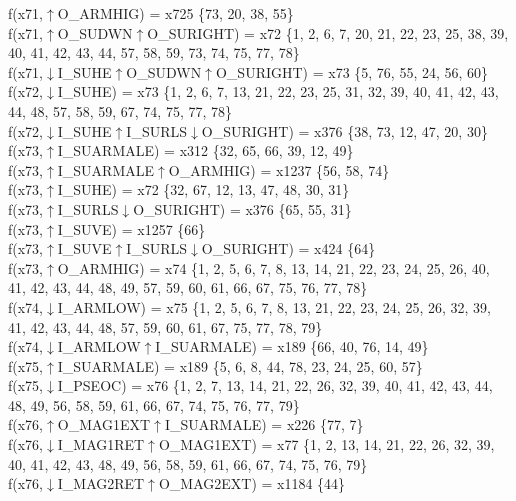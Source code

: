 f(x71,$\uparrow$O\_ARMHIG) = x725 \{73, 20, 38, 55\} \\  
f(x71,$\uparrow$O\_SUDWN$\uparrow$O\_SURIGHT) = x72 \{1, 2, 6, 7, 20, 21, 22, 23, 25, 38, 39, 40, 41, 42, 43, 44, 57, 58, 59, 73, 74, 75, 77, 78\} \\  
f(x71,$\downarrow$I\_SUHE$\uparrow$O\_SUDWN$\uparrow$O\_SURIGHT) = x73 \{5, 76, 55, 24, 56, 60\} \\  
f(x72,$\downarrow$I\_SUHE) = x73 \{1, 2, 6, 7, 13, 21, 22, 23, 25, 31, 32, 39, 40, 41, 42, 43, 44, 48, 57, 58, 59, 67, 74, 75, 77, 78\} \\  
f(x72,$\downarrow$I\_SUHE$\uparrow$I\_SURLS$\downarrow$O\_SURIGHT) = x376 \{38, 73, 12, 47, 20, 30\} \\  
f(x73,$\uparrow$I\_SUARMALE) = x312 \{32, 65, 66, 39, 12, 49\} \\  
f(x73,$\uparrow$I\_SUARMALE$\uparrow$O\_ARMHIG) = x1237 \{56, 58, 74\} \\  
f(x73,$\uparrow$I\_SUHE) = x72 \{32, 67, 12, 13, 47, 48, 30, 31\} \\  
f(x73,$\uparrow$I\_SURLS$\downarrow$O\_SURIGHT) = x376 \{65, 55, 31\} \\  
f(x73,$\uparrow$I\_SUVE) = x1257 \{66\} \\  
f(x73,$\uparrow$I\_SUVE$\uparrow$I\_SURLS$\downarrow$O\_SURIGHT) = x424 \{64\} \\  
f(x73,$\uparrow$O\_ARMHIG) = x74 \{1, 2, 5, 6, 7, 8, 13, 14, 21, 22, 23, 24, 25, 26, 40, 41, 42, 43, 44, 48, 49, 57, 59, 60, 61, 66, 67, 75, 76, 77, 78\} \\  
f(x74,$\downarrow$I\_ARMLOW) = x75 \{1, 2, 5, 6, 7, 8, 13, 21, 22, 23, 24, 25, 26, 32, 39, 41, 42, 43, 44, 48, 57, 59, 60, 61, 67, 75, 77, 78, 79\} \\  
f(x74,$\downarrow$I\_ARMLOW$\uparrow$I\_SUARMALE) = x189 \{66, 40, 76, 14, 49\} \\  
f(x75,$\uparrow$I\_SUARMALE) = x189 \{5, 6, 8, 44, 78, 23, 24, 25, 60, 57\} \\  
f(x75,$\downarrow$I\_PSEOC) = x76 \{1, 2, 7, 13, 14, 21, 22, 26, 32, 39, 40, 41, 42, 43, 44, 48, 49, 56, 58, 59, 61, 66, 67, 74, 75, 76, 77, 79\} \\  
f(x76,$\uparrow$O\_MAG1EXT$\uparrow$I\_SUARMALE) = x226 \{77, 7\} \\  
f(x76,$\downarrow$I\_MAG1RET$\uparrow$O\_MAG1EXT) = x77 \{1, 2, 13, 14, 21, 22, 26, 32, 39, 40, 41, 42, 43, 48, 49, 56, 58, 59, 61, 66, 67, 74, 75, 76, 79\} \\  
f(x76,$\downarrow$I\_MAG2RET$\uparrow$O\_MAG2EXT) = x1184 \{44\} \\  
